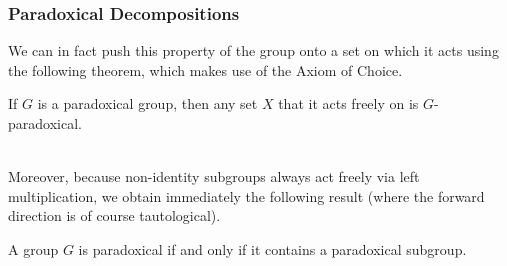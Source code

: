 \documentclass{beamer}
\theoremstyle{example}
\begin{document}
\begin{frame}
\frametitle{Paradoxical Decompositions}
We can in fact push this property of the group onto a set on which it acts using the following theorem, which makes use of the Axiom of Choice.\\[0.5\baselineskip]

\begin{theorem}
If $G$ is a paradoxical group, then any set $X$ that it acts freely on is $G$-paradoxical. %
\end{theorem}
\noindent\\[0.5\baselineskip] Moreover, because non-identity subgroups always act freely via left multiplication, we obtain immediately the following result (where the forward direction is of course tautological).\\[0.5\baselineskip]
\begin{corollary}
A group $G$ is paradoxical if and only if it contains a paradoxical subgroup.
\end{corollary}
\noindent\\[0.5\baselineskip] %

\end{frame}
\end{document}
